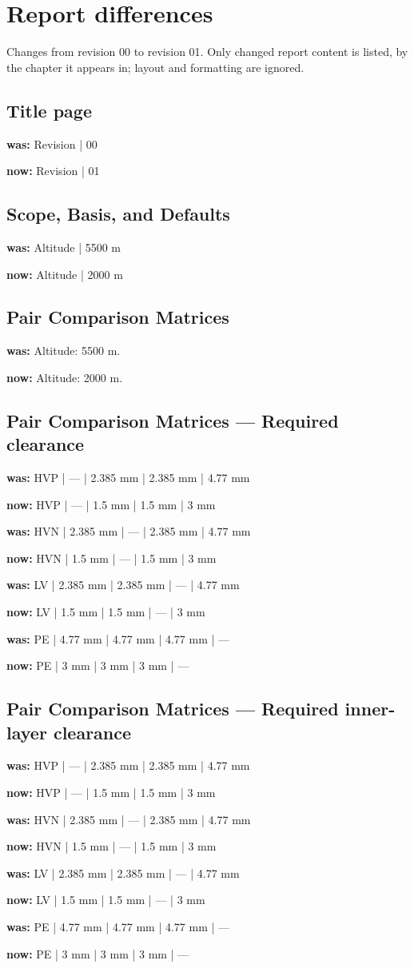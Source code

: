 \documentclass[10pt]{article}
\begin{document}
\section*{Report differences}
Changes from revision 00 to revision 01. Only changed report content is listed, by the chapter it appears in; layout and formatting are ignored.\par
\bigskip
\subsection*{Title page}
\textbf{was:} Revision | 00\par
\textbf{now:} Revision | 01\par
\subsection*{Scope, Basis, and Defaults}
\textbf{was:} Altitude | 5500 m\par
\textbf{now:} Altitude | 2000 m\par
\subsection*{Pair Comparison Matrices}
\textbf{was:} Altitude: 5500 m.\par
\textbf{now:} Altitude: 2000 m.\par
\subsection*{Pair Comparison Matrices — Required clearance}
\textbf{was:} HVP | — | 2.385 mm | 2.385 mm | 4.77 mm\par
\textbf{now:} HVP | — | 1.5 mm | 1.5 mm | 3 mm\par
\textbf{was:} HVN | 2.385 mm | — | 2.385 mm | 4.77 mm\par
\textbf{now:} HVN | 1.5 mm | — | 1.5 mm | 3 mm\par
\textbf{was:} LV | 2.385 mm | 2.385 mm | — | 4.77 mm\par
\textbf{now:} LV | 1.5 mm | 1.5 mm | — | 3 mm\par
\textbf{was:} PE | 4.77 mm | 4.77 mm | 4.77 mm | —\par
\textbf{now:} PE | 3 mm | 3 mm | 3 mm | —\par
\subsection*{Pair Comparison Matrices — Required inner-layer clearance}
\textbf{was:} HVP | — | 2.385 mm | 2.385 mm | 4.77 mm\par
\textbf{now:} HVP | — | 1.5 mm | 1.5 mm | 3 mm\par
\textbf{was:} HVN | 2.385 mm | — | 2.385 mm | 4.77 mm\par
\textbf{now:} HVN | 1.5 mm | — | 1.5 mm | 3 mm\par
\textbf{was:} LV | 2.385 mm | 2.385 mm | — | 4.77 mm\par
\textbf{now:} LV | 1.5 mm | 1.5 mm | — | 3 mm\par
\textbf{was:} PE | 4.77 mm | 4.77 mm | 4.77 mm | —\par
\textbf{now:} PE | 3 mm | 3 mm | 3 mm | —\par
\end{document}
